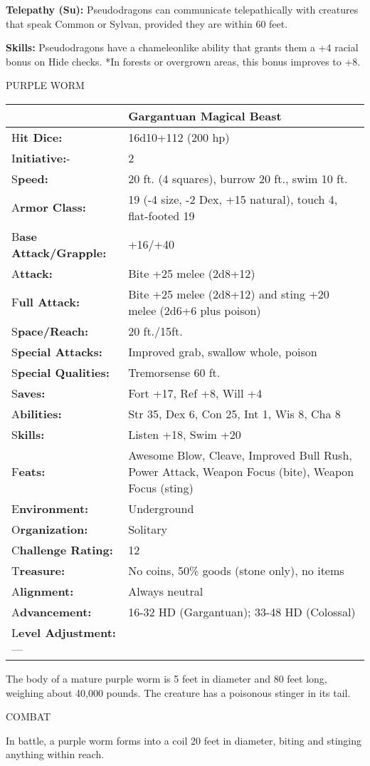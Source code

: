 \documentclass{article}
\begin{document}
\textbf{Telepathy (Su):} Pseudodragons can communicate telepathically with creatures 
that speak Common or Sylvan, provided they are within 60 feet.

\textbf{Skills: }Pseudodragons have a chameleonlike ability that grants them a 
+4 racial bonus on Hide checks. *In forests or overgrown areas, this bonus improves 
to +8.

\vspace{12pt}
{\LARGE{}PURPLE WORM}

\begin{tabular}{|>{\raggedright}p{89pt}|>{\raggedright}p{236pt}|}
\hline
  & Gargantuan Magical Beast\tabularnewline
\hline
H\textbf{it Dice:} & 16d10+112 (200 hp)\tabularnewline
\hline
I\textbf{nitiative:}- & 2\tabularnewline
\hline
S\textbf{peed:} & 20 ft. (4 squares), burrow 20 ft., swim 10 ft.\tabularnewline
\hline
A\textbf{rmor Class:} & 19 (-4 size, -2 Dex, +15 natural), touch 4, flat-footed 
19\tabularnewline
\hline
B\textbf{ase Attack/Grapple:} & +16/+40\tabularnewline
\hline
A\textbf{ttack:} & Bite +25 melee (2d8+12)\tabularnewline
\hline
F\textbf{ull Attack:} & Bite +25 melee (2d8+12) and sting +20 melee (2d6+6 plus 
poison)\tabularnewline
\hline
S\textbf{pace/Reach:} & 20 ft./15ft.\tabularnewline
\hline
S\textbf{pecial Attacks:} & Improved grab, swallow whole, poison\tabularnewline
\hline
S\textbf{pecial Qualities:} & Tremorsense 60 ft.\tabularnewline
\hline
S\textbf{aves:} & Fort +17, Ref +8, Will +4\tabularnewline
\hline
A\textbf{bilities:} & Str 35, Dex 6, Con 25, Int 1, Wis 8, Cha 8\tabularnewline
\hline
S\textbf{kills:} & Listen +18, Swim +20\tabularnewline
\hline
F\textbf{eats:} & Awesome Blow, Cleave, Improved Bull Rush, Power Attack, Weapon 
Focus (bite), Weapon Focus (sting)\tabularnewline
\hline
E\textbf{nvironment:} & Underground\tabularnewline
\hline
O\textbf{rganization:} & Solitary\tabularnewline
\hline
C\textbf{hallenge Rating:} & 12\tabularnewline
\hline
T\textbf{reasure:} & No coins, 50\% goods (stone only), no items\tabularnewline
\hline
A\textbf{lignment:} & Always neutral\tabularnewline
\hline
A\textbf{dvancement:} & 16-32 HD (Gargantuan); 33-48 HD (Colossal)\tabularnewline
\hline
L\textbf{evel Adjustment:}--- & \tabularnewline
\hline
\end{tabular}

The body of a mature purple worm is 5 feet in diameter and 80 feet long, weighing 
about 40,000 pounds. The creature has a poisonous stinger in its tail.

COMBAT

In battle, a purple worm forms into a coil 20 feet in diameter, biting and stinging 
anything within reach.
\end{document}
